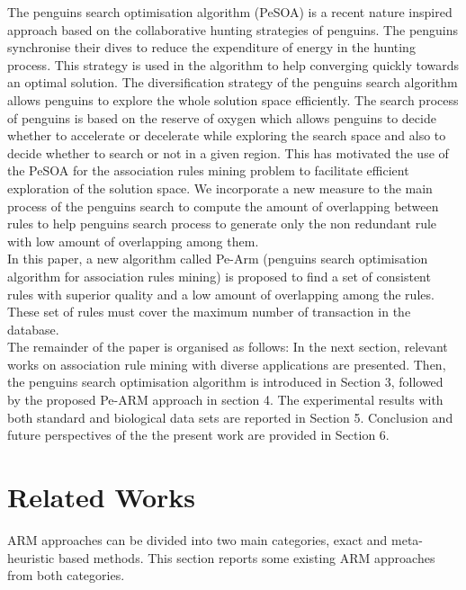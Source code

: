 \documentclass[preprint,12pt]{elsarticle}
\begin{document}
The penguins search optimisation algorithm (PeSOA) \cite{15} is a recent nature inspired approach based on the collaborative hunting strategies of penguins. The penguins synchronise their dives to reduce the expenditure of energy in the hunting process. This strategy is used in the algorithm to help converging quickly towards an optimal solution. The diversification strategy of the penguins search algorithm allows penguins to explore  the whole solution space efficiently. The search process of penguins is based on the reserve of oxygen which allows penguins to decide whether to accelerate or decelerate while exploring the search space and also to decide whether to search or not in a given region. This has motivated the use of the PeSOA for the association rules mining problem to facilitate efficient exploration of the solution space. We incorporate a new measure to the main process of the penguins search to compute the amount of overlapping between rules to help penguins search process to generate only the non redundant rule with low amount of overlapping among them. \\
In this paper, a new algorithm called Pe-Arm (penguins search optimisation algorithm for association rules mining) is proposed  to find a set of consistent rules with superior quality and a low amount of overlapping among the rules. These set of rules must cover the maximum number of transaction in the database.\\
The remainder of the paper is organised as follows: In the next section, relevant works on association rule mining with diverse applications are presented. 
Then, the penguins search optimisation algorithm is introduced in Section 3, 
followed by the proposed Pe-ARM approach   in section 4. 
The experimental results with both standard and biological data sets are reported in Section 5. 
Conclusion and future perspectives of the the present work are provided in Section 6.

\section{Related Works}
ARM approaches can be divided into two main categories, exact and meta-heuristic based methods.
This section reports some existing ARM approaches from both categories.
\end{document}
